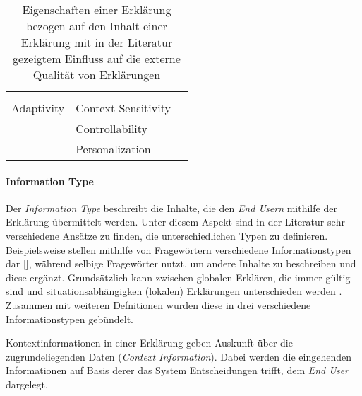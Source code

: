 \begin{table}[bht!]
\begin{center}
\begin{tabular}{|p{}|p{}|p{}|}
                                                \cite{hernandez-bocanegra_effects_2020} \\
            \hline
            Adaptivity          & Context-Sensitivity & \cite{kaptein_personalised_2017} \cite{cassens_ambient_2019} \\
                                & Controllability & \cite{abdulrahman_belief-based_2019} \cite{cheng2019explaining} \\
                                & Personalization & \cite{kaptein_personalised_2017} \cite{cassens_ambient_2019}
                                                    \cite{sokol_one_2020} \cite{tintarev_designing_nodate}
                                                    \cite{sokol_explainability_2020} \\
                                
            \hline
        \end{tabular}
    \end{center}
    \caption{Eigenschaften einer Erklärung bezogen auf den Inhalt einer Erklärung mit in der Literatur gezeigtem Einfluss auf die externe Qualität von Erklärungen}
    \label{tab:content_of_explanations}
\end{table}

\paragraph{Information Type} Der \textit{Information Type} beschreibt die Inhalte, die den \textit{End Usern} mithilfe der Erklärung übermittelt werden. Unter diesem Aspekt sind in der Literatur sehr verschiedene Ansätze zu finden, die unterschiedlichen Typen zu definieren. Beispielsweise stellen \cite{chazette_end-users_nodate} mithilfe von Fragewörtern verschiedene Informationstypen dar [\cite{chazette_end-users_nodate}], während \citeauthor{rosenfeld_explainability_2019} selbige Fragewörter nutzt, um andere Inhalte zu beschreiben und diese ergänzt. Grundsätzlich kann zwischen globalen Erklären, die immer gültig sind und situationsabhängigken (lokalen) Erklärungen unterschieden werden \cite{lim_2009_assessing}. Zusammen mit weiteren Defnitionen \cite{kaptein_personalised_2017, abdulrahman_belief-based_2019} wurden diese in drei verschiedene Informationstypen gebündelt.

Kontextinformationen in einer Erklärung geben Auskunft über die zugrundeliegenden Daten (\textit{Context Information}). Dabei werden die eingehenden Informationen auf Basis derer das System Entscheidungen trifft, dem \textit{End User} dargelegt.

